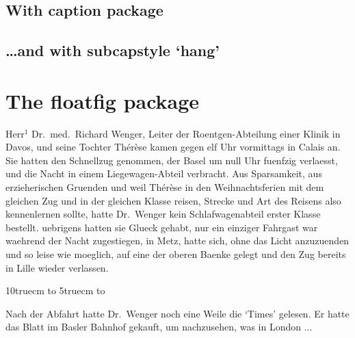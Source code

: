\documentclass[a4paper]{article}
\makeatletter
\let\c@makesubfigurecaption\@makesubfigurecaption
\newcommand*\mycaptionstyle{%
  \captionstyle{indent}%
  \renewcommand\captionfont{\small}%
  \renewcommand\captionlabelfont{\bfseries}%
  \setcaptionmargin{\leftmargini}%
  \setlength\captionindent{\parindent}%
  \renewcommand\captionlabeldelim{.}%
  \onelinecaptionstrue}
\makeatother
\begin{document}
\clearpage
\subsection{With caption package}
\makeatletter
\let\@makesubfigurecaption\c@makesubfigurecaption
\makeatother
{}

\clearpage
\subsection{\dots and with subcapstyle `hang'}
\renewcommand\subcapsize{\footnotesize\itshape}
\renewcommand\subcaplabelfont{\upshape}

\fi


\ifx\floatingfigure\undefined
\else
\clearpage
\mycaptionstyle
\section{The floatfig package}
\sloppy

Herr$^{1}$ Dr.~med.~Richard Wenger, Leiter der Roent\-gen-Ab\-tei\-lung
einer Klinik in Davos, und seine
Tochter Th\'e\-r\`ese kamen gegen elf Uhr vormittags
in Calais an. Sie hatten den Schnellzug genommen,
der Basel um null Uhr fuenfzig verlaesst, und die
Nacht in einem Liege\-wagen-Abteil verbracht.
Aus Sparsamkeit, aus erzieherischen Gruenden und weil
Th\'e\-r\`ese in den Weihnachtsferien mit dem gleichen
Zug und in der gleichen Klasse reisen, Strecke und
Art des Reisens also kennenlernen sollte, hatte Dr.~Wenger
kein Schlafwagenabteil erster Klasse bestellt.
uebrigens hatten sie Glueck gehabt, nur ein
einziger Fahrgast war waehrend der Nacht zugestiegen,
in Metz, hatte sich, ohne das Licht anzuzuenden
und so leise wie moeglich, auf eine der oberen
Baenke gelegt und den Zug bereits in Lille wieder
verlassen.\par
\begin{floatingfigure}{10truecm}
%
\vbox to 5truecm{\vfil
                 \hbox to %
                 \vfil}
%
\caption{Irgendwelcher Text, der die Abb. erlaeutert.}
\end{floatingfigure}
%
Nach der Abfahrt hatte Dr.~Wen\-ger noch eine
Weile die `Times' gelesen. Er hatte das Blatt im
Basler Bahnhof gekauft, um nachzusehen, was in London ...

\fussy
\fi


\ifx\wrapfigure\undefined
\else
\ifx\floatingfigure\undefined
  \clearpage
  \mycaptionstyle
\fi
\end{document}
